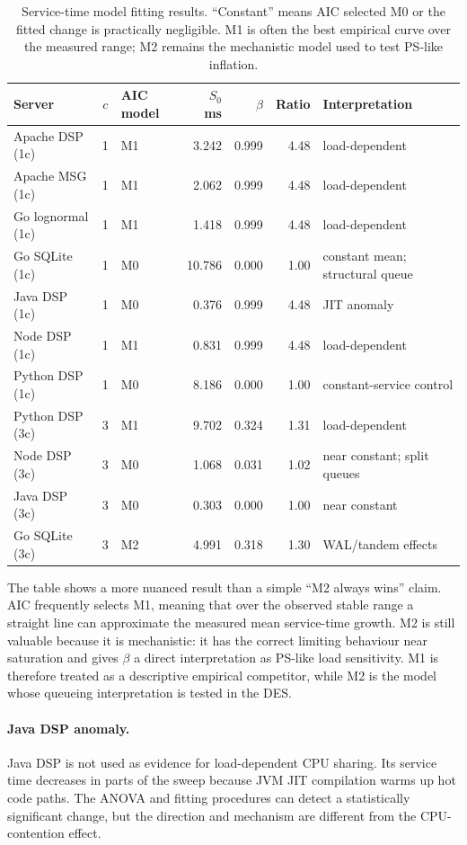 \begin{table}[h]
\centering
\caption{Service-time model fitting results. ``Constant'' means AIC selected M0 or the fitted change is practically negligible. M1 is often the best empirical curve over the measured range; M2 remains the mechanistic model used to test PS-like inflation.}
\label{tab:fit-params}
\begin{tabular}{l c l r r r l}
\toprule
\textbf{Server} & \textbf{$c$} & \textbf{AIC model} & \textbf{$S_0$ ms} & \textbf{$\beta$} & \textbf{Ratio} & \textbf{Interpretation} \\
\midrule
Apache DSP (1c)   & 1 & M1 & 3.242 & 0.999 & 4.48 & load-dependent \\
Apache MSG (1c)   & 1 & M1 & 2.062 & 0.999 & 4.48 & load-dependent \\
Go lognormal (1c) & 1 & M1 & 1.418 & 0.999 & 4.48 & load-dependent \\
Go SQLite (1c)    & 1 & M0 & 10.786 & 0.000 & 1.00 & constant mean; structural queue \\
Java DSP (1c)     & 1 & M0 & 0.376 & 0.999 & 4.48 & JIT anomaly \\
Node DSP (1c)     & 1 & M1 & 0.831 & 0.999 & 4.48 & load-dependent \\
Python DSP (1c)   & 1 & M0 & 8.186 & 0.000 & 1.00 & constant-service control \\
Python DSP (3c)   & 3 & M1 & 9.702 & 0.324 & 1.31 & load-dependent \\
Node DSP (3c)     & 3 & M0 & 1.068 & 0.031 & 1.02 & near constant; split queues \\
Java DSP (3c)     & 3 & M0 & 0.303 & 0.000 & 1.00 & near constant \\
Go SQLite (3c)    & 3 & M2 & 4.991 & 0.318 & 1.30 & WAL/tandem effects \\
\bottomrule
\end{tabular}
\end{table}

The table shows a more nuanced result than a simple ``M2 always wins'' claim. AIC frequently selects M1, meaning that over the observed stable range a straight line can approximate the measured mean service-time growth. M2 is still valuable because it is mechanistic: it has the correct limiting behaviour near saturation and gives $\beta$ a direct interpretation as PS-like load sensitivity. M1 is therefore treated as a descriptive empirical competitor, while M2 is the model whose queueing interpretation is tested in the DES.

\paragraph{Java DSP anomaly.}
Java DSP is not used as evidence for load-dependent CPU sharing. Its service time decreases in parts of the sweep because JVM JIT compilation warms up hot code paths. The ANOVA and fitting procedures can detect a statistically significant change, but the direction and mechanism are different from the CPU-contention effect.

